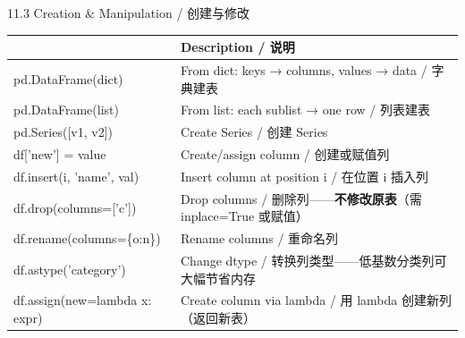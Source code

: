 \documentclass[11pt,a4paper]{report}
\begin{document}
\begin{cmdsection}{11.3  Creation \& Manipulation / 创建与修改}
\normalsize\renewcommand{\arraystretch}{1.4}
\centering
\begin{tabularx}{\textwidth}{@{}>{\ttfamily}l>{\raggedright\arraybackslash}X@{}}
\toprule
\multicolumn{1}{@{}l}{\textbf{Syntax}} & \textbf{Description / 说明} \\ \midrule
pd.DataFrame(dict)          & From dict: keys → columns, values → data / 字典建表 \\
pd.DataFrame(list)          & From list: each sublist → one row / 列表建表 \\
pd.Series([v1, v2])         & Create Series / 创建 Series \\
df['new'] = value           & Create/assign column / 创建或赋值列 \\
df.insert(i, 'name', val)   & Insert column at position i / 在位置 i 插入列 \\
df.drop(columns=['c'])      & Drop columns / 删除列——\textbf{不修改原表}（需 inplace=True 或赋值） \\
df.rename(columns=\{o:n\})   & Rename columns / 重命名列 \\
df.astype('category')       & Change dtype / 转换列类型——低基数分类列可大幅节省内存 \\
df.assign(new=lambda x: expr) & Create column via lambda / 用 lambda 创建新列（返回新表） \\
\bottomrule
\end{tabularx}
\end{cmdsection}
\end{document}
